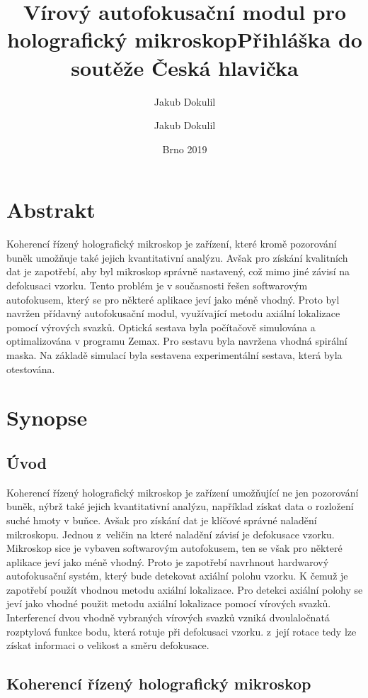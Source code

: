 \documentclass[12pt, a4paper, twoside]{article}
\title{Vírový autofokusační modul pro holografický mikroskop}
\date{Brno 2019}
\author{Jakub Dokulil}
\title{Přihláška do soutěže Česká hlavička}
\author{Jakub Dokulil}
\begin{document}



\section*{Abstrakt}

Koherencí řízený holografický mikroskop je zařízení, které kromě pozorování buněk umožňuje
také jejich kvantitativní analýzu. Avšak pro získání kvalitních dat je zapotřebí, aby byl mikroskop
správně nastavený, což mimo jiné závisí na defokusaci vzorku. Tento problém je v současnosti
řešen softwarovým autofokusem, který se pro některé aplikace jeví jako méně vhodný. Proto
byl navržen přídavný autofokusační modul, využívající metodu axiální lokalizace pomocí
výrových svazků. Optická sestava byla počítačově simulována a optimalizována v programu Zemax. Pro sestavu
byla navržena vhodná spirální maska. Na základě simulací byla sestavena experimentální
sestava, která byla otestována.

\section*{Synopse}

\subsection*{Úvod}

Koherencí řízený holografický mikroskop je zařízení umožňující ne jen pozorování buněk,
nýbrž také jejich kvantitativní analýzu, například získat data o rozložení suché hmoty v buňce.
Avšak pro získání dat je klíčové správné naladění mikroskopu. Jednou z~veličin na které naladění
závisí je defokusace vzorku. Mikroskop sice je vybaven softwarovým autofokusem, ten se
však pro některé aplikace jeví jako méně vhodný. Proto je zapotřebí navrhnout hardwarový
autofokusační systém, který bude detekovat axiální polohu vzorku. K čemuž je zapotřebí
použít vhodnou metodu axiální lokalizace.
Pro detekci axiální polohy se jeví jako vhodné použit metodu axiální lokalizace pomocí
vírových svazků. Interferencí dvou vhodně vybraných vírových svazků vzniká dvoulaloč\-na\-tá
rozptylová funkce bodu, která rotuje při defokusaci vzorku. z~její rotace tedy lze získat
informaci o velikost a směru defokusace.

\subsection*{Koherencí řízený holografický mikroskop}
\end{document}
